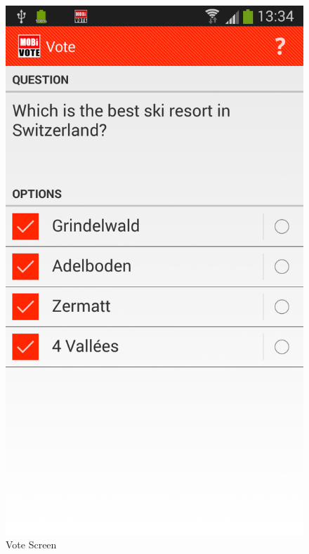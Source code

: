 \documentclass[numbers=noenddot, abstract=on, a4paper, headsepline,
footsepline, oneside, draft=off]{scrreprt}
\begin{document}
\begin{figure}[!htb]
	\begin{minipage}{.5\textwidth}
  		\centering
		\includegraphics[height=.4\textheight]{img/screenshots/vote}
		\caption{Vote Screen}
		\label{fig:handbook_votescreen}
	\end{minipage}
	\begin{minipage}{.5\textwidth}
  		\centering

\end{minipage}
\end{figure}
\end{document}

